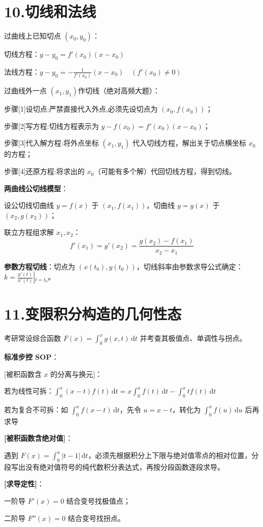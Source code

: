 \documentclass[11pt,a4paper,UTF8]{ctexart}
\begin{document}
\section{10.切线和法线}

\textit{}过曲线上已知切点 $(x_0, y_0)$\textit{}：

切线方程：$y - y_0 = f'(x_0)(x - x_0)$

法线方程：$y - y_0 = -\frac{1}{f'(x_0)}(x - x_0) \quad (f'(x_0) \neq 0)$

\textit{}过曲线外一点 $(x_1, y_1)$作切线（绝对高频大题）\textit{}：

步骤[1]设切点:严禁直接代入外点,必须先设切点为 $(x_0, f(x_0))$；

步骤[2]写方程:切线方程表示为 $y - f(x_0) = f'(x_0)(x - x_0)$；

步骤[3]代入解方程:将外点坐标 $(x_1, y_1)$ 代入切线方程，解出关于切点横坐标 $x_0$ 的方程；

步骤[4]还原方程:将求出的 $x_0$（可能有多个解）代回切线方程，得到切线。

\textbf{两曲线公切线模型}：

设公切线切曲线 $y = f(x)$ 于 $(x_1, f(x_1))$，切曲线 $y = g(x)$ 于 $(x_2, g(x_2))$；

联立方程组求解 $x_1, x_2$：
\begin{equation*}
f'(x_1) = g'(x_2) = \frac{g(x_2) - f(x_1)}{x_2 - x_1}
\end{equation*}


\textbf{参数方程切线}：切点为 $(x(t_0), y(t_0))$，切线斜率由参数求导公式确定：$k = \left.\frac{y'(t)}{x'(t)}\right\vert{}_{t=t_0}$。


\section{11.变限积分构造的几何性态}

考研常设综合函数 $F(x) = \int_0^x g(x, t)\,\mathrm{d}t$ 并考查其极值点、单调性与拐点。

\textbf{标准步控 SOP}：

\begin{solbox}[分步推导与答题规范]
  \textit{}[被积函数含 $x$ 的分离与换元]\textit{}：

  若为线性可拆：$\int_0^x (x - t)f(t)\,\mathrm{d}t = x\int_0^x f(t)\,\mathrm{d}t - \int_0^x tf(t)\,\mathrm{d}t$

  若为复合不可拆：如 $\int_0^x f(x - t)\,\mathrm{d}t$，先令 $u = x - t$，转化为 $\int_0^x f(u)\,\mathrm{d}u$ 后再求导

  \textbf{[被积函数含绝对值]}：

  遇到 $F(x) = \int_0^x \vert{}t - 1\vert{}\,\mathrm{d}t$，必须先根据积分上下限与绝对值零点的相对位置，分段写出没有绝对值符号的纯代数积分表达式，再按分段函数逐段求导。

  \textbf{[求导定性]}：

  一阶导 $F'(x) = 0$ 结合变号找极值点；

  二阶导 $F''(x) = 0$ 结合变号找拐点。

  
\end{solbox}
\end{document}
